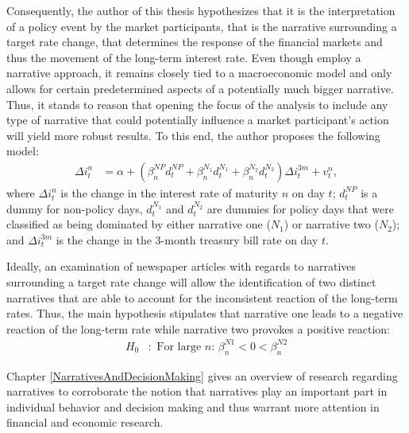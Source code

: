 \documentclass[11pt,a4paper,english,oneside]{book}
\numberwithin{equation}{chapter}
\begin{document}
Consequently, the author of this thesis hypothesizes that it is the interpretation of a policy event by the market participants, that is the narrative surrounding a target rate change, that determines the response of the financial markets and thus the movement of the long-term interest rate. Even though \cite{Ellingsen.2003} employ a narrative approach, it remains closely tied to a macroeconomic model and only allows for certain predetermined aspects of a potentially much bigger narrative. Thus, it stands to reason that opening the focus of the analysis to include any type of narrative that could potentially influence a market participant's action will yield more robust results. To this end, the author proposes the following model:
\begin{align}\label{reg2}
\Delta i^n_t &= \alpha + (\beta_n^{NP}d_t^{NP} + \beta_n^{N_1}d_t^{N_1} + \beta_n^{N_2}d_t^{N_2})\Delta i^{3m}_t + v_t^n,
\end{align}
where $\Delta i^n_t$ is the change in the interest rate of maturity $n$ on day $t$; $d_t^{NP}$ is a dummy for non-policy days, $d_t^{N_1}$ and $d_t^{N_2}$ are dummies for policy days that were classified as being dominated by either narrative one ($N_1$) or narrative two ($N_2$); and $\Delta i^{3m}_t$ is the change in the 3-month treasury bill rate on day $t$.

Ideally, an examination of newspaper articles with regards to narratives surrounding a target rate change will allow the identification of two distinct narratives that are able to account for the inconsistent reaction of the long-term rates. Thus, the main hypothesis stipulates that narrative one leads to a negative reaction of the long-term rate while narrative two provokes a positive reaction:
\begin{align}\label{H00}
H_0&:  \text{ For large $n$: } \beta_n^{N1}<0< \beta_n^{N2}
\end{align}

Chapter \ref{NarrativesAndDecisionMaking} 
gives an overview of research regarding narratives to corroborate the notion that narratives play an important part in individual behavior and decision making and thus warrant more attention in financial and economic research. 

\end{document}
